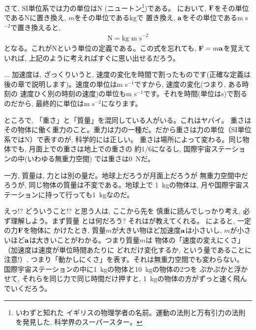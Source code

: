 さて, SI単位系では力の単位はN (ニュートン\footnote{いわずと知れた
イギリスの物理学者の名前。運動の法則と万有引力の法則
を発見した, 科学界のスーパースター。})である。
において, ${\bf F}$をその単位であるNに置き換え, $m$をその単位であるkgで
置き換え, ${\bf a}$をその単位であるm s$^{-2}$で置き換えると, 
\begin{eqnarray}
\text{N}=\text{kg m~s}^{-2}\label{ed:def_N}
\end{eqnarray}
となる。これがNという単位の定義である。この式を忘れても, ${\bf F}=m{\bf a}$を覚えて
いれば, 上記のように考えればすぐに思い出せるだろう。

\begin{faq}{\small{}
 ... 加速度は, ざっくりいうと, 速度の変化を時間で割ったものです(正確な定義は
後の章で説明します)。速度の単位はm s$^{-1}$ですから, 速度の変化(つまり, ある時刻の
速度ひく別の時刻の速度)の単位もm s$^{-1}$です。それを時間(単位はs)で割るのだから, 
最終的に単位はm s$^{-2}$になります。}\end{faq}

ところで, 「重さ」と「質量」を混同している人がいる。これはヤバイ。 重さは
その物体に働く重力のこと。重力は力の一種だ。だから重さは力の単位（SI単位系ではN）で表すのが, 科学的には正しい。
重さは場所によって変わる。同じ物体でも, 月面上での重さは地上での重さの
約1/6になるし, 国際宇宙ステーションの中(いわゆる無重力空間)
では重さは0~Nだ。

一方, 質量は, 力とは別の量だ。地球上だろうが月面上だろうが
無重力空間中だろうが, 同じ物体の質量は不変である。地球上で
1~kgの物体は, 月や国際宇宙ステーションに持って行っても1~kgなのだ。

えっ!? どういうこと!? と思う人は, ここから先を
慎重に読んでしっかり考え, 必ず理解しよう。まず質量
とは何だろう? それはが教えてくれる。
によると, 一定の力${\bf F}$を物体に
かけたとき, 質量$m$が大きい物ほど加速度${\bf a}$は小さいし, 
$m$が小さいほど${\bf a}$は大きいことがわかる。つまり質量$m$は
物体の「速度の変えにくさ」（加速度は速度が単位時間あたりに
どれだけ変化するか, という量であることに注意!）, 
つまり「動かしにくさ」を表す。それは無重力空間でも変わらない。
国際宇宙ステーションの中に1~kgの物体と10~kgの物体の2つを
ぷかぷかと浮かせて, それらを同じ力で同じ時間だけ押すと, 
1~kgの物体の方がずっと速く飛んでいくだろう。

